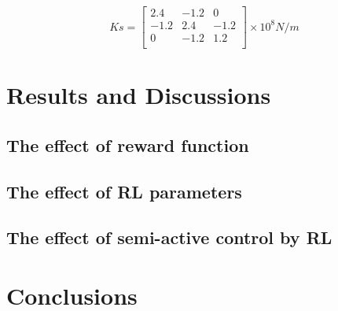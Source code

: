 \begin{equation}       
Ks=\left[                 
  \begin{array}{ccc}   
  2.4 & -1.2 & 0 \\
  -1.2 & 2.4 & -1.2 \\
  0 & -1.2 & 1.2 \\
  \end{array}
\right]     
\times 10^{8} N/m        
\end{equation}
\section{Results and Discussions}
\subsection{The effect of reward function}
\subsection{The effect of RL parameters}
\subsection{The effect of semi-active control by RL}
\section{Conclusions}





%

%
%




